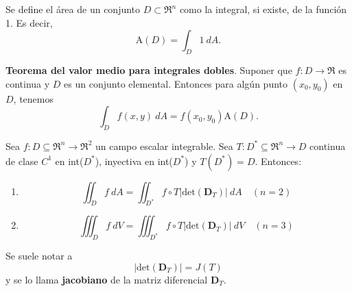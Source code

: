 \begin{definition} %
    Se define el \'area de un conjunto $D\subset\Re^n$ como la integral, si existe, de la funci\'on 1. Es decir,
    \[
        \text{A}(D)=\int_D1\:dA.  
    \]
\end{definition}
\begin{theorem}
    \textbf{Teorema del valor medio para integrales dobles}. Suponer que $f:D\to\Re$ es continua y $D$ es un conjunto elemental. Entonces para alg\'un punto $(x_0,y_0)$ en $D$, tenemos
    \[
        \int_D f(x,y)\:dA=f(x_0,y_0)\text{A}(D).
    \]
\end{theorem}
\begin{theorem} %
    Sea $f:D\subseteq\Re^n\to\Re^2$ un campo escalar integrable. Sea $T:D^*\subseteq\Re^n\to D$ continua de clase $C^1$ en int($D^*$), inyectiva en int($D^*$) y $T(D^*)=D$. Entonces:
    \begin{enumerate}
        \item 
        \[
            \iint_D f\:dA=\iint_{D^*}f\circ T|\text{det}(\boldsymbol{D}_T)|\:dA\quad(n=2)
        \]
        \item 
        \[
            \iiint_D f\:dV=\iiint_{D^*}f\circ T|\text{det}(\boldsymbol{D}_T)|\:dV\quad(n=3)
        \]
    \end{enumerate}
    Se suele notar a 
    \[
        |\text{det}(\boldsymbol{D}_T)|=J(T)
    \]
    y se lo llama \textbf{jacobiano} de la matriz diferencial $\boldsymbol{D}_T$.
\end{theorem}